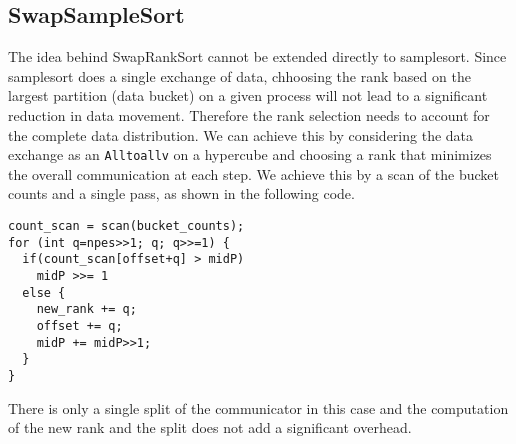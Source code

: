 \subsection{{\sc SwapSampleSort}} The idea behind {\sc SwapRankSort} cannot be extended directly to samplesort. Since samplesort does a single exchange of data, chhoosing the rank based on the largest partition (data bucket) on a given process will not lead to a significant reduction in data movement. Therefore the rank selection needs to account for the complete data distribution. We can achieve this by considering the data exchange as an \texttt{Alltoallv} on a hypercube and choosing a rank that minimizes the overall communication at each step. We achieve this by a scan of the bucket counts and a single pass, as shown in the following code. 
\begin{verbatim}
count_scan = scan(bucket_counts);
for (int q=npes>>1; q; q>>=1) {
  if(count_scan[offset+q] > midP) 
    midP >>= 1
  else {
    new_rank += q;
    offset += q;
    midP += midP>>1;
  }	
}    
\end{verbatim}  
There is only a single split of the communicator in this case and the computation of the new rank and the split does not add a significant overhead.  